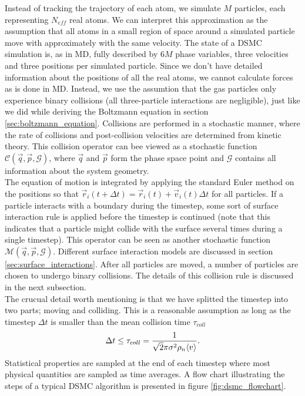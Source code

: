 Instead of tracking the trajectory of each atom, we simulate $M$ particles, each representing $N_{eff}$ real atoms. We can interpret this approximation as the assumption that all atoms in a small region of space around a simulated particle move with approximately with the same velocity. The state of a DSMC simulation is, as in MD, fully described by $6M$ phase variables, three velocities and three positions per simulated particle. Since we don't have detailed information about the positions of all the real atoms, we cannot calculate forces as is done in MD. Instead, we use the assumtion that the gas particles only experience binary collisions (all three-particle interactions are negligible), just like we did while deriving the Boltzmann equation in section \ref{sec:boltzmann_equation}. Collisions are performed in a stochastic manner, where the rate of collisions and post-collision velocities are determined from kinetic theory. This collision operator can bee viewed as a stochastic function $\mathcal{C}(\vec q, \vec p, \mathcal{G})$, where $\vec q$ and $\vec p$ form the phase space point and $\mathcal G$ contains all information about the system geometry.\\
The equation of motion is integrated by applying the standard Euler method on the positions so that $\vec r_i(t+\Delta t) = \vec r_i(t) + \vec v_i(t)\Delta t$ for all particles. If a particle interacts with a boundary during the timestep, some sort of surface interaction rule is applied before the timestep is continued (note that this indicates that a particle might collide with the surface several times during a single timestep). This operator can be seen as another stochastic function $\mathcal{M}(\vec q, \vec p, \mathcal{G})$. Different surface interaction models are discussed in section \ref{sec:surface_interactions}. After all particles are moved, a number of particles are chosen to undergo binary collisions. The details of this collision rule is discussed in the next subsection.\\
The crucual detail worth mentioning is that we have splitted the timestep into two parts; moving and colliding. This is a reasonable assumption as long as the timestep $\Delta t$ is smaller than the mean collision time $\tau_{coll}$
\begin{align}
	\Delta t \leq \tau_{coll} = {1\over \sqrt 2 \pi \sigma^2 \rho_n \langle v \rangle}.
\end{align}
Statistical properties are sampled at the end of each timestep where most physical quantities are sampled as time averages. A flow chart illustrating the steps of a typical DSMC algorithm is presented in figure \ref{fig:dsmc_flowchart}.
